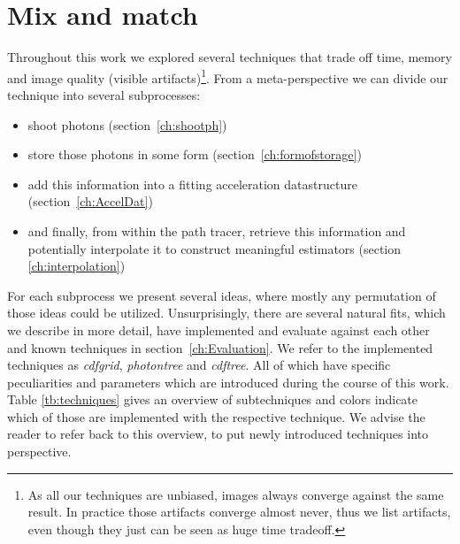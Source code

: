 \section{Mix and match}

Throughout this work we explored several techniques that trade off time, memory and image quality (visible artifacts)\footnote{As all our techniques are unbiased, images always converge against the same result. In practice those artifacts converge almost never, thus we list artifacts, even though they just can be seen as huge time tradeoff.}. From a meta-perspective we can divide our technique into several subprocesses:

\begin{itemize}
    \item shoot photons (section~\ref{ch:shootph})
    \item store those photons in some form (section~\ref{ch:formofstorage})
    \item add this information into a fitting acceleration datastructure (section~\ref{ch:AccelDat})
    \item and finally, from within the path tracer, retrieve this information and potentially interpolate it to construct meaningful estimators (section \ref{ch:interpolation})
\end{itemize}

For each subprocess we present several ideas, where mostly any permutation of those ideas could be utilized. Unsurprisingly, there are several natural fits, which we describe in more detail, have implemented and evaluate against each other and known techniques in section~\ref{ch:Evaluation}. We refer to the implemented techniques as \textit{cdfgrid}, \textit{photontree} and \textit{cdftree}. All of which have specific peculiarities and parameters which are introduced during the course of this work. Table \ref{tb:techniques} gives an overview of subtechniques and colors indicate which of those are implemented with the respective technique. We advise the reader to refer back to this overview, to put newly introduced techniques into perspective.

